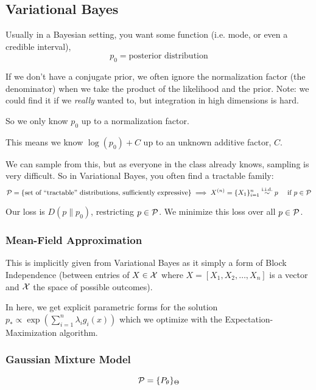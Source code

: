 \subsection{Variational Bayes}
Usually in a Bayesian setting, you want some function (i.e. mode, or even a credible interval),
$$
p_0 = \text{posterior distribution}
$$

If we don't have a conjugate prior, we often ignore the normalization factor (the denominator) when we take the product of the likelihood and the prior. Note: we could find it if we \textit{really} wanted to, but integration in high dimensions is hard.

So we only know $p_0$ up to a normalization factor.

This means we know $\log(p_0)+C$ up to an unknown additive factor, $C$.

We can sample from this, but as everyone in the class already knows, sampling is very difficult. So in Variational Bayes, you often find a tractable family:
\begin{equation}
    \mathcal{P} = \{\text{set of ``tractable'' distributions, sufficiently expressive}\}
    \implies X^{(n)} = \{X_1\}_{i=1}^n\overset{\text{i.i.d.}}{\sim} p\quad\text{ if } p\in\mathcal{P}
\end{equation}

Our loss is $D(p\| p_0)$, restricting $p\in\mathcal{P}$. We minimize this loss over all $p\in\mathcal{P}$.

\subsubsection{Mean-Field Approximation}
This is implicitly given from Variational Bayes as it simply a form of Block Independence (between entries of $X\in\mathcal{X}$ where $X=[X_1,X_2,\ldots,X_n]$ is a vector and $\mathcal{X}$ the space of possible outcomes).

In here, we get explicit parametric forms for the solution $p_\ast \propto \exp(\sum_{i=1}^n \lambda_i g_i(x))$ which we optimize with the Expectation-Maximization algorithm.

\subsubsection{Gaussian Mixture Model}
\begin{equation}
    \mathcal{P} = \{P_\theta\}_\Theta
\end{equation}

